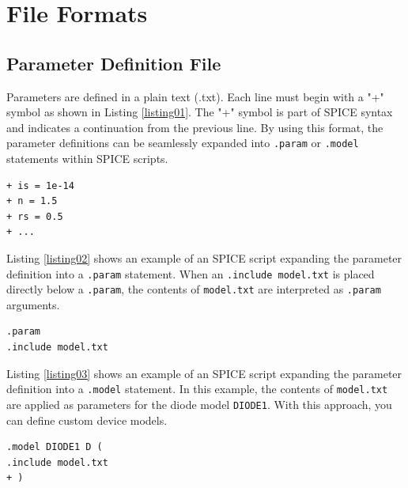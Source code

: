 \documentclass[a4paper,12pt,titlepage]{article}
\begin{document}
\section{File Formats}

\subsection{Parameter Definition File}

Parameters are defined in a plain text (.txt). Each line must begin with a "+" symbol as shown in
Listing \ref{listing01}. The "+" symbol is part of SPICE syntax and indicates a continuation from
the previous line. By using this format, the parameter definitions can be seamlessly expanded into
\texttt{.param} or \texttt{.model} statements within SPICE scripts.

\begin{lstlisting}[label=listing01,caption=Example of parameter definition]
+ is = 1e-14
+ n = 1.5
+ rs = 0.5
+ ...
\end{lstlisting}

Listing \ref{listing02} shows an example of an SPICE script expanding the parameter definition into
a \texttt{.param} statement. When an \texttt{.include model.txt} is placed directly below a
\texttt{.param}, the contents of \texttt{model.txt} are interpreted as \texttt{.param} arguments.

\begin{lstlisting}[label=listing02,caption=SPICE script expanding into a \texttt{.param} statement]
.param
.include model.txt
\end{lstlisting}

Listing \ref{listing03} shows an example of an SPICE script expanding the parameter definition into
a \texttt{.model} statement. In this example, the contents of \texttt{model.txt} are applied as
parameters for the diode model \texttt{DIODE1}. With this approach, you can define custom device
models.

\begin{lstlisting}[label=listing03,caption=SPICE script expanding into a \texttt{.model} statement]
.model DIODE1 D (
.include model.txt
+ )
\end{lstlisting}
\end{document}
